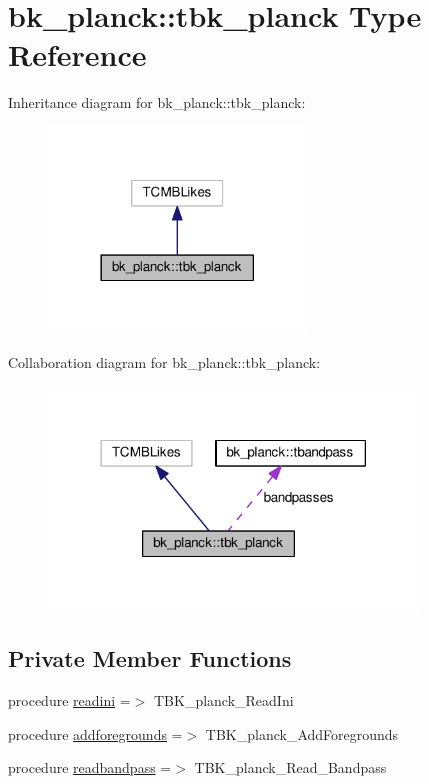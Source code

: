 \hypertarget{structbk__planck_1_1tbk__planck}{}\section{bk\+\_\+planck\+:\+:tbk\+\_\+planck Type Reference}
\label{structbk__planck_1_1tbk__planck}


Inheritance diagram for bk\+\_\+planck\+:\+:tbk\+\_\+planck\+:
\nopagebreak
\begin{figure}[H]
\begin{center}
\leavevmode
\includegraphics[width=194pt]{structbk__planck_1_1tbk__planck__inherit__graph}
\end{center}
\end{figure}


Collaboration diagram for bk\+\_\+planck\+:\+:tbk\+\_\+planck\+:
\nopagebreak
\begin{figure}[H]
\begin{center}
\leavevmode
\includegraphics[width=278pt]{structbk__planck_1_1tbk__planck__coll__graph}
\end{center}
\end{figure}
\subsection*{Private Member Functions}
\begin{DoxyCompactItemize}
\item 
procedure \mbox{\hyperlink{structbk__planck_1_1tbk__planck_a2b81d44b4d0f03cc23a7e7ce864999a2}{readini}} =$>$ T\+B\+K\+\_\+planck\+\_\+\+Read\+Ini
\item 
procedure \mbox{\hyperlink{structbk__planck_1_1tbk__planck_ae2798374030523fb23a4c7eb6f094f3f}{addforegrounds}} =$>$ T\+B\+K\+\_\+planck\+\_\+\+Add\+Foregrounds
\item 
procedure \mbox{\hyperlink{structbk__planck_1_1tbk__planck_a96c8beebcea587a7c8a5a5205f946347}{readbandpass}} =$>$ T\+B\+K\+\_\+planck\+\_\+\+Read\+\_\+\+Bandpass
\end{DoxyCompactItemize}
